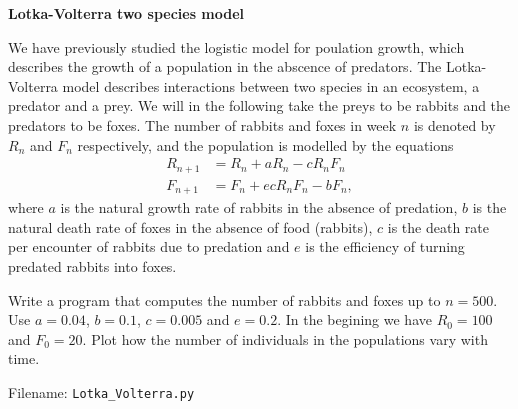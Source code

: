 \begin{Problem}{\textbf{Lotka-Volterra two species model}}

\noindent We have previously studied the logistic model for poulation growth, which
describes the growth of a population in the abscence of predators. The
Lotka-Volterra model describes interactions between two species in an ecosystem,
a predator and a prey. We will in the following take the preys to be rabbits and the
predators to be foxes. The number of rabbits and foxes in week $n$ is denoted by
$R_n$ and $F_n$ respectively, and the population is modelled by the equations
\begin{align*}
R_{n+1} &= R_n + aR_n - cR_nF_n\\
F_{n+1} &= F_n + ecR_nF_n - bF_n,
\end{align*}
where $a$ is the natural growth rate of rabbits in the absence of predation, $b$ is
the natural death rate of foxes in the absence of food (rabbits), $c$ is the death
rate per encounter of rabbits due to predation and $e$ is the efficiency of turning
predated rabbits into foxes.

Write a program that computes the number of rabbits and foxes up to $n = 500$.
Use $a = 0.04$, $b = 0.1$, $c = 0.005$ and $e = 0.2$. In the begining we have
$R_0 = 100$ and $F_0 = 20$. Plot how the number of individuals in the populations
vary with time.

Filename: \texttt{Lotka\_Volterra.py}
\end{Problem}

